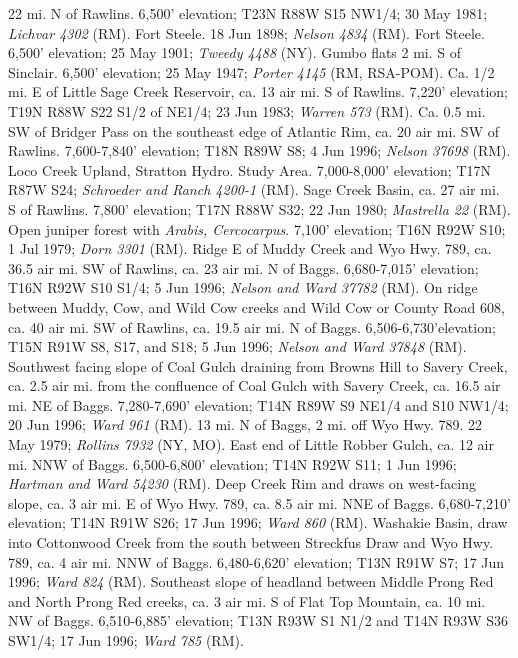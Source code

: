 22 mi. N of Rawlins. 6,500’ elevation; T23N R88W S15 NW1/4; 30 May 1981;
\textit{Lichvar 4302} (RM).
Fort Steele. 18 Jun 1898; \textit{Nelson 4834} (RM).
Fort Steele. 6,500’ elevation; 25 May 1901; \textit{Tweedy 4488} (NY).
Gumbo flats 2 mi. S of Sinclair. 6,500’ elevation; 25 May 1947;
\textit{Porter 4145} (RM, RSA-POM).
Ca. 1/2 mi. E of Little Sage Creek Reservoir, ca. 13 air mi. S of Rawlins.
7,220’ elevation; T19N R88W S22 S1/2 of NE1/4; 23 Jun 1983;
\textit{Warren 573} (RM).
Ca. 0.5 mi. SW of Bridger Pass on the southeast edge of Atlantic Rim, ca. 20 air
mi. SW of Rawlins. 7,600-7,840’ elevation; T18N R89W S8; 4 Jun 1996;
\textit{Nelson 37698} (RM).
Loco Creek Upland, Stratton Hydro. Study Area. 7,000-8,000’ elevation;
T17N R87W S24; \textit{Schroeder and Ranch 4200-1} (RM).
Sage Creek Basin, ca. 27 air mi. S of Rawlins. 7,800’ elevation; T17N R88W S32;
22 Jun 1980; \textit{Mastrella 22} (RM).
Open juniper forest with \textit{Arabis, Cercocarpus}. 7,100’ elevation;
T16N R92W S10; 1 Jul 1979; \textit{Dorn 3301} (RM).
Ridge E of Muddy Creek and Wyo Hwy. 789, ca. 36.5 air mi. SW of Rawlins, ca. 23
air mi. N of Baggs. 6,680-7,015’ elevation; T16N R92W S10 S1/4; 5 Jun 1996;
\textit{Nelson and Ward 37782} (RM).
On ridge between Muddy, Cow, and Wild Cow creeks and Wild Cow or County Road
608, ca. 40 air mi. SW of Rawlins, ca. 19.5 air mi. N of Baggs.
6,506-6,730’elevation; T15N R91W S8, S17, and S18; 5 Jun 1996;
\textit{Nelson and Ward 37848} (RM).
Southwest facing slope of Coal Gulch draining from Browns Hill to Savery Creek,
ca. 2.5 air mi. from the confluence of Coal Gulch with Savery Creek, ca. 16.5
air mi. NE of Baggs.	7,280-7,690' elevation; T14N R89W S9 NE1/4 and S10 NW1/4;
20 Jun 1996; \textit{Ward 961} (RM).
13 mi. N of Baggs, 2 mi. off Wyo Hwy. 789. 22 May 1979;
\textit{Rollins 7932} (NY, MO).
East end of Little Robber Gulch, ca. 12 air mi. NNW of Baggs. 6,500-6,800’
elevation; T14N R92W S11; 1 Jun 1996; \textit{Hartman and Ward 54230} (RM).
Deep Creek Rim and draws on west-facing slope, ca. 3 air mi. E of Wyo Hwy. 789,
ca. 8.5 air mi. NNE of Baggs. 6,680-7,210’ elevation; T14N R91W S26;
17 Jun 1996; \textit{Ward 860} (RM).
Washakie Basin, draw into Cottonwood Creek from the south between Streckfus Draw
and Wyo Hwy. 789, ca. 4 air mi. NNW of Baggs. 6,480-6,620’ elevation;
T13N R91W S7; 17 Jun 1996; \textit{Ward 824} (RM).
Southeast slope of headland between Middle Prong Red and North
Prong Red creeks, ca. 3 air mi. S of Flat Top Mountain, ca. 10 mi. NW of Baggs.
6,510-6,885’ elevation; T13N R93W S1 N1/2 and T14N R93W S36 SW1/4; 17 Jun 1996;
\textit{Ward 785} (RM).
